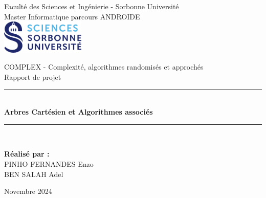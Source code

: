 \documentclass[a4paper,12pt]{report}
\begin{document}

\begin{titlepage}
    \centering


    {\large Faculté des Sciences et Ingénierie - Sorbonne Université}\\[0.3cm]
    {\large Master Informatique parcours ANDROIDE}\\[1cm]
    \includegraphics[width=0.3\textwidth]{../images/logo_SU.png}\\[1.5cm]



    \vspace{1.5cm}

    {\LARGE COMPLEX - Complexité, algorithmes randomisés et approchés}\\[1cm]
    {\Large Rapport de projet}\\[2cm]
    \rule{\linewidth}{0.5mm} \\[1cm]
    {\Huge \textbf{Arbres Cartésien et Algorithmes associés}} \\[0.4cm]
    \rule{\linewidth}{0.5mm} \\[2cm]
    


    \begin{flushleft}
        \textbf{Réalisé par :} \\[0.3cm]
        PINHO FERNANDES Enzo \\[0.2cm]
        BEN SALAH Adel \\[2cm]
    \end{flushleft}
    


    \vfill
    {\large Novembre 2024}\\
    
\end{titlepage}
\end{document}
